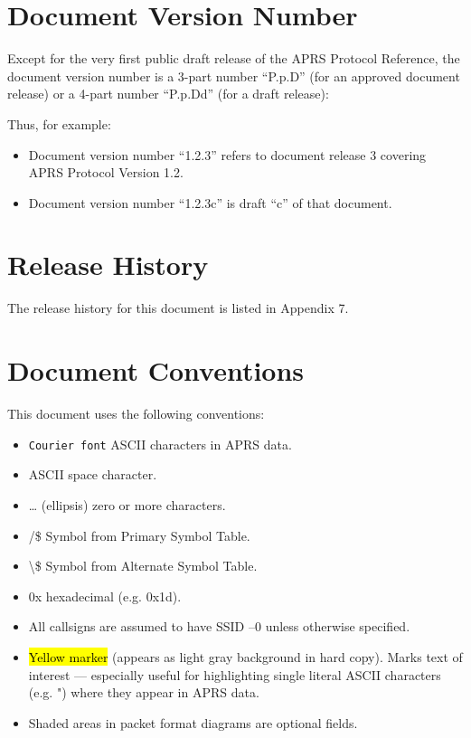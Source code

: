 \section*{Document Version Number}

Except for the very first public draft release of the APRS Protocol
Reference, the document version number is a 3-part number “P.p.D” (for
an approved document release) or a 4-part number “P.p.Dd” (for a draft
release):




Thus, for example:

\begin{itemize}

\item Document version number “1.2.3” refers to document release 3 covering
APRS Protocol Version 1.2.

\item Document version number “1.2.3c” is draft “c” of that document.

\end{itemize}


\section*{Release History}

The release history for this document is listed in Appendix 7.

\section*{Document Conventions}

This document uses the following conventions:
\begin{itemize}

\item \texttt {Courier font} ASCII characters in APRS data.

\item \textvisiblespace  ASCII space character.

\item … (ellipsis) zero or more characters.

\item /\$ Symbol from Primary Symbol Table.

\item \textbackslash\$ Symbol from Alternate Symbol Table.

\item 0x hexadecimal (e.g. 0x1d).

\item All callsigns are assumed to have SSID –0 unless otherwise specified.

\item \hl{Yellow marker} (appears as light gray background in hard copy).
Marks text of interest — especially useful for highlighting single
literal ASCII characters (e.g. ") where they appear in APRS data.

\item Shaded areas in packet format diagrams are optional fields.

\end{itemize}

